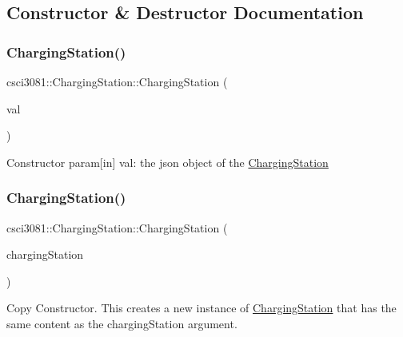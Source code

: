 \subsection{Constructor \& Destructor Documentation}
\mbox{\label{classcsci3081_1_1ChargingStation_a97fba4a68715e6b8305557c9b76571dd}} 
\subsubsection{\texorpdfstring{Charging\+Station()}{ChargingStation()}\hspace{0.1cm}{\footnotesize\ttfamily [1/2]}}
{\footnotesize\ttfamily csci3081\+::\+Charging\+Station\+::\+Charging\+Station (\begin{DoxyParamCaption}\item[{const picojson\+::object \&}]{val }\end{DoxyParamCaption})}

Constructor param\mbox{[}in\mbox{]} val\+: the json object of the \hyperlink{classcsci3081_1_1ChargingStation}{Charging\+Station} \mbox{\label{classcsci3081_1_1ChargingStation_a3e5d04367a8cb19604714f6544e104b0}} 
\subsubsection{\texorpdfstring{Charging\+Station()}{ChargingStation()}\hspace{0.1cm}{\footnotesize\ttfamily [2/2]}}
{\footnotesize\ttfamily csci3081\+::\+Charging\+Station\+::\+Charging\+Station (\begin{DoxyParamCaption}\item[{\hyperlink{classcsci3081_1_1ChargingStation}{Charging\+Station} \&}]{charging\+Station }\end{DoxyParamCaption})}



Copy Constructor. This creates a new instance of \hyperlink{classcsci3081_1_1ChargingStation}{Charging\+Station} that has the same content as the charging\+Station argument. 


